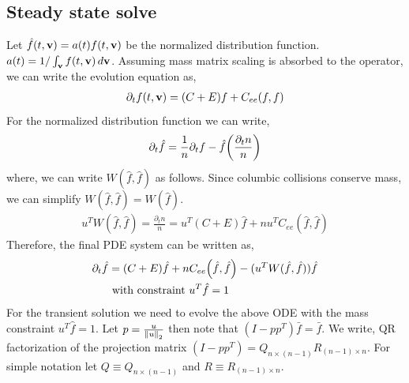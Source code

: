 \documentclass{article}[draft]
\begin{document}
\subsection{Steady state solve}
Let $\hat{f}(t,\mathbf{v})= a(t) f(t, \mathbf{v})$ be the normalized distribution function. $a(t) = 1 / \int_{\mathbf{v}} f(t,\mathbf{v})\, d\mathbf{v}$. Assuming mass matrix scaling is absorbed to the operator, we can write the evolution equation as, 
\begin{align*}
	\partial_t f\of{t,\vect{v}} &= (C + E) f + C_{ee}(f,f) \\
\end{align*} For the normalized distribution function we can write, 
\begin{align*}
	\partial_t {\hat{f}} &= \frac{1}{n} \partial_t f - \hat{f} \of{\frac{\partial_t n }{n}}\\
\end{align*} where, we can write $W(\hat{f}, \hat{f})$ as follows. Since columbic collisions conserve mass, we can simplify $W(\hat{f}, \hat{f}) = W(\hat{f})$. 
\begin{align*}
	u^T W (\hat{f}, \hat{f}) = \frac{\partial_t n}{n} = u^T(C+ E)\hat{f} + n u^T C_{ee}(\hat{f},\hat{f}) 
\end{align*} Therefore, the final PDE system can be written as, 
\begin{align*}
	\partial_t {\hat{f}} &=(C+E)\hat{f} + n C_{ee}\of{\hat{f}, \hat{f}} - (u^T W(\hat{f}, \hat{f})) \hat{f}\\
	&\text{ with constraint } u^T \hat{f} = 1  
\end{align*}
For the transient solution we need to evolve the above ODE with the mass constraint $u^T \hat{f}=1$.  Let $p = \frac{u}{\left\lVert u\right\rVert_2}$ then note that $(I-pp^T)\bar{f} = \bar{f}$. We write, QR factorization of the projection matrix $(I-pp^T) = Q_{n\times (n-1)} R_{(n-1)\times n}$. For simple notation let $Q \equiv Q_{n \times (n-1)}$ and $R \equiv R_{(n-1)\times n}$.
\end{document}
